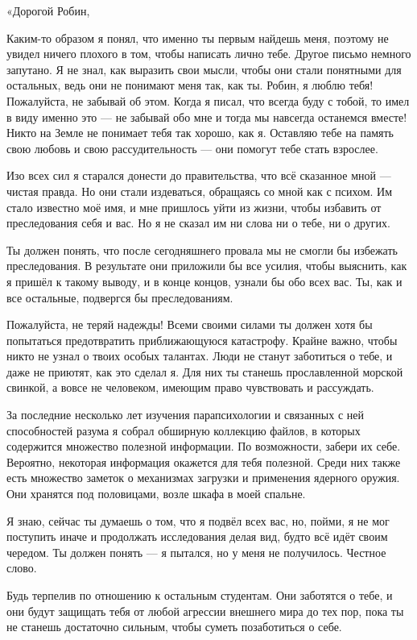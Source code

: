 \documentclass[a5paper, 9pt,
final, openany, twoside=true]{memoir}
\begin{document}
«Дорогой Робин,\bigskip

Каким-то образом я понял, что именно ты первым найдешь меня, поэтому не увидел ничего плохого в том, чтобы написать лично тебе. Другое письмо немного запутано. Я не знал, как выразить свои мысли, чтобы они стали понятными для остальных, ведь они не понимают меня так, как ты. Робин, я люблю тебя! Пожалуйста, не забывай об этом. Когда я писал, что всегда буду с тобой, то имел в виду именно это — не забывай обо мне и тогда мы навсегда останемся вместе! Никто на Земле не понимает тебя так хорошо, как я. Оставляю тебе на память свою любовь и свою рассудительность — они помогут тебе стать взрослее.

Изо всех сил я старался донести до правительства, что всё сказанное мной — чистая правда. Но они стали издеваться, обращаясь со мной как с психом. Им стало известно моё имя, и мне пришлось уйти из жизни, чтобы избавить от преследования себя и вас. Но я не сказал им ни слова ни о тебе, ни о других.

Ты должен понять, что после сегодняшнего провала мы не смогли бы избежать преследования. В результате они приложили бы все усилия, чтобы выяснить, как я пришёл к такому выводу, и в конце концов, узнали бы обо всех вас. Ты, как и все остальные, подвергся бы преследованиям.

Пожалуйста, не теряй надежды! Всеми своими силами ты должен хотя бы попытаться предотвратить приближающуюся катастрофу. Крайне важно, чтобы никто не узнал о твоих особых талантах. Люди не станут заботиться о тебе, и даже не приютят, как это сделал я. Для них ты станешь прославленной морской свинкой, а вовсе не человеком, имеющим право чувствовать и рассуждать.

За последние несколько лет изучения парапсихологии и связанных с ней способностей разума я собрал обширную коллекцию файлов, в которых содержится множество полезной информации. По возможности, забери их себе. Вероятно, некоторая информация окажется для тебя полезной. Среди них также есть множество заметок о механизмах загрузки и применения ядерного оружия. Они хранятся под половицами, возле шкафа в моей спальне.

Я знаю, сейчас ты думаешь о том, что я подвёл всех вас, но, пойми, я не мог поступить иначе и продолжать исследования делая вид, будто всё идёт своим чередом. Ты должен понять — я пытался, но у меня не получилось. Честное слово.

Будь терпелив по отношению к остальным студентам. Они заботятся о тебе, и они будут защищать тебя от любой агрессии внешнего мира до тех пор, пока ты не станешь достаточно сильным, чтобы суметь позаботиться о себе.
\end{document}
